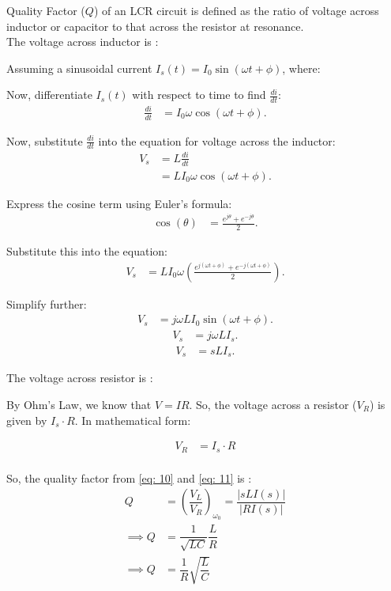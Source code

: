 \documentclass[journal,12pt,twocolumn]{IEEEtran}
\theoremstyle{remark}
\begin{document}
Quality Factor ($Q$) of an LCR circuit is defined as the ratio of voltage across inductor or capacitor to that across the resistor at resonance.\\

The voltage across inductor is : 

Assuming a sinusoidal current $I_s(t) = I_0 \sin(\omega t + \phi)$, where:

Now, differentiate $I_s(t)$ with respect to time to find $\frac{di}{dt}$:
\begin{align}
    \frac{di}{dt} & = I_0 \omega \cos(\omega t + \phi).
\end{align}

Now, substitute $\frac{di}{dt}$ into the equation for voltage across the inductor:
\begin{align}
    V_s & = L \frac{di}{dt} \\
    & = L I_0 \omega \cos(\omega t + \phi).
\end{align}

Express the cosine term using Euler's formula:
\begin{align}
    \cos(\theta) & = \frac{e^{j\theta} + e^{-j\theta}}{2}.
\end{align}

Substitute this into the equation:
\begin{align}
    V_s & = L I_0 \omega \left(\frac{e^{j(\omega t + \phi)} + e^{-j(\omega t + \phi)}}{2}\right).
\end{align}

Simplify further:
\begin{align}
    V_s & = j\omega L I_0 \sin(\omega t + \phi).
\end{align}
\begin{align}
    V_s & = j\omega L I_s.
\end{align}
\begin{align}
    V_s & = s L I_s.\label{eq: 10}
\end{align}

The voltage across resistor is :

By Ohm's Law, we know that \(V = IR\). So, the voltage across a resistor (\(V_R\)) is given by \(I_s \cdot R\). In mathematical form:

\begin{align}
    V_R & = I_s \cdot R \\\label{eq: 11}
\end{align}

So, the quality factor from \eqref{eq: 10} and \eqref{eq: 11} is : 
\begin{align}
    Q &= \left(\dfrac{V_L}{V_R}\right)_{\omega_0} = \dfrac{\lvert{sLI(s)}\rvert}{\lvert RI(s) \rvert}\\
    \implies Q &= \dfrac{1}{\sqrt{LC}}\dfrac{L}{R}\\
    \implies Q &= \dfrac{1}{R}\sqrt{\dfrac{L}{C}}\label{eq: 9}
\end{align}
\end{document}

